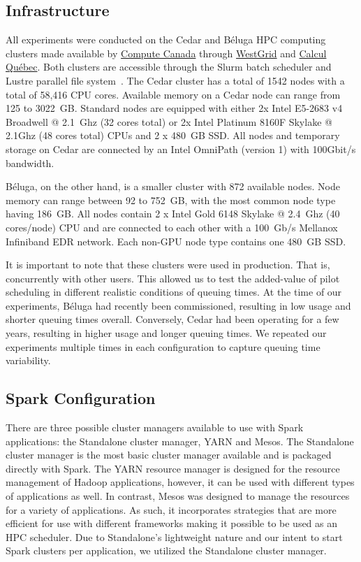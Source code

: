 	\subsection{Infrastructure}
	All experiments were conducted on the Cedar and B\'eluga HPC computing
	clusters made available by \href{https://www.computecanada.ca}{Compute
	Canada} through \href{https://www.westgrid.ca}{WestGrid} and
	\href{http://www.calculquebec.ca}{Calcul Qu\'ebec}. Both clusters are
	accessible through the Slurm batch scheduler and Lustre parallel file
	system~\cite{schwan2003lustre}. The Cedar cluster has a total of 1542
	nodes with a total of 58,416 CPU cores. Available memory on a Cedar
	node can range from 125 to 3022~GB. Standard nodes are equipped with
	either 2x Intel E5-2683 v4 Broadwell @ 2.1~Ghz (32 cores total) or 2x
	Intel Platinum 8160F Skylake @ 2.1Ghz (48 cores total) CPUs and 2 x
	480~GB SSD. All nodes and temporary storage on Cedar are connected by an
	Intel OmniPath (version 1) with 100Gbit/s bandwidth.
    
	B\'eluga, on the other hand, is a smaller cluster with 872 available
	nodes. Node memory can range between 92 to 752~GB, with the most common
	node type having 186~GB. All nodes contain 2 x Intel Gold 6148 Skylake @
	2.4~Ghz (40 cores/node) CPU and are connected to each other with a
	100~Gb/s Mellanox Infiniband EDR network. Each non-GPU
	node type contains one 480~GB SSD. 
    
	It is important to note that these clusters were used in production.
	That is, concurrently with other users. This allowed us to test the
	added-value of pilot scheduling in different realistic conditions of queuing
	times. At the time of our experiments, B\'eluga had recently been
	commissioned, resulting in low usage and shorter queuing times overall.
	Conversely, Cedar had been operating for a few years, resulting in
	higher usage and longer queuing times. We repeated our experiments multiple 
	times in each configuration to capture queuing time variability.
    
	\subsection{Spark Configuration}
    
	There are three possible cluster managers available to use with Spark applications:
	the Standalone cluster manager, YARN and Mesos. The Standalone cluster manager is the
	most basic cluster manager available and is packaged directly with Spark. The 
	YARN resource manager is designed for the resource management of Hadoop applications, however,
	it can be used with different types of applications as well. In contrast, Mesos was 
	designed to manage the resources for a variety of applications. As such, it incorporates
	strategies that are more efficient for use with different frameworks making it possible
	to be used as an HPC scheduler. Due to Standalone's lightweight nature and our intent
	to start Spark clusters per application, we utilized the Standalone cluster manager.
    
